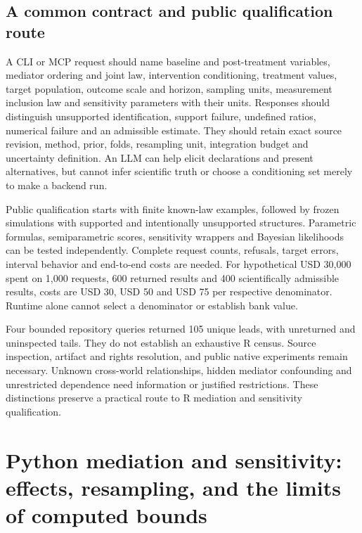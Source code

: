 \subsection{A common contract and public qualification route}

A CLI or MCP request should name baseline and post-treatment variables,
mediator ordering and joint law, intervention conditioning, treatment values,
target population, outcome scale and horizon, sampling units, measurement
inclusion law and sensitivity parameters with their units. Responses should
distinguish unsupported identification, support failure, undefined ratios,
numerical failure and an admissible estimate. They should retain exact source
revision, method, prior, folds, resampling unit, integration budget and
uncertainty definition. An LLM can help elicit declarations and present
alternatives, but cannot infer scientific truth or choose a conditioning set
merely to make a backend run. \citep{exec25_rmed_choice}

Public qualification starts with finite known-law examples, followed by frozen
simulations with supported and intentionally unsupported structures. Parametric
formulas, semiparametric scores, sensitivity wrappers and Bayesian likelihoods
can be tested independently. Complete request counts, refusals, target errors,
interval behavior and end-to-end costs are needed. For hypothetical USD 30,000
spent on 1,000 requests, 600 returned results and 400 scientifically admissible
results, costs are USD 30, USD 50 and USD 75 per respective denominator. Runtime
alone cannot select a denominator or establish bank value. \citep{exec25_rmed_choice}

Four bounded repository queries returned 105 unique leads, with unreturned
and uninspected tails. They do not establish an exhaustive R census. Source
inspection, artifact and rights resolution, and public native experiments
remain necessary. Unknown cross-world relationships, hidden mediator
confounding and unrestricted dependence need information or justified
restrictions. These distinctions preserve a practical route to R mediation
and sensitivity qualification. \citep{exec25_rmed_choice}


\section[Python mediation and sensitivity contracts]{Python mediation and sensitivity: effects, resampling, and the limits of computed bounds}
\label{sec:exec25-pymed}

